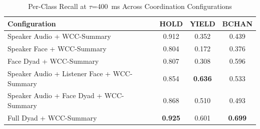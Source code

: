 \begin{table}[h]
\caption{Per-Class Recall at $\tau$=400~ms Across Coordination Configurations}
\label{tab:recall_per_class_coordination}
\small
\renewcommand{\arraystretch}{1.20}
\begin{tabular}{>{\raggedright\arraybackslash}p{4cm}ccc}
\toprule
Configuration & HOLD & YIELD & BCHAN \\
\midrule
Speaker Audio + WCC-Summary & 0.912 & 0.352 & 0.439 \\
Speaker Face + WCC-Summary & 0.804 & 0.172 & 0.376 \\
Face Dyad + WCC-Summary & 0.807 & 0.308 & 0.596 \\
Speaker Audio + Listener Face + WCC-Summary & 0.854 & \textbf{0.636} & 0.533 \\
Speaker Audio + Face Dyad + WCC-Summary & 0.868 & 0.510 & 0.493 \\
Full Dyad + WCC-Summary & \textbf{0.925} & 0.601 & \textbf{0.699} \\
\bottomrule
\end{tabular}
\end{table}
